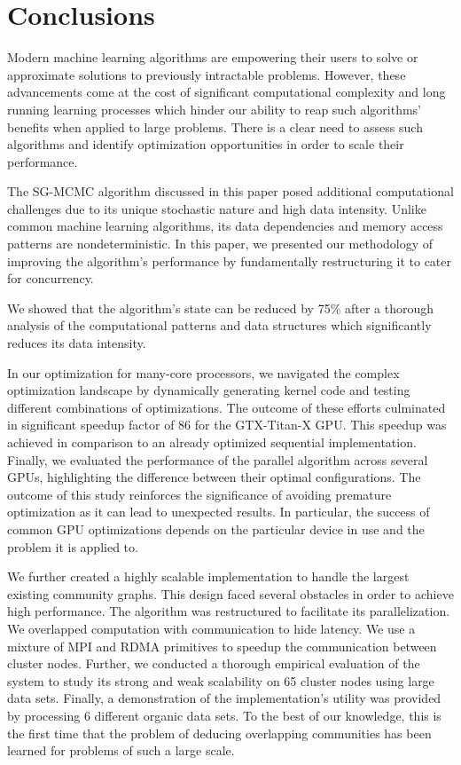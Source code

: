 \section{Conclusions}
\label{sec-conclusion}

Modern machine learning algorithms are empowering their
users to solve or approximate solutions to previously intractable problems.
However, these advancements come at the cost of significant computational
complexity and long running learning processes which hinder our ability to reap
such algorithms' benefits when applied to large problems. There is a clear need
to assess such algorithms and identify optimization opportunities in order to
scale their performance.

The SG-MCMC algorithm discussed in this paper posed additional computational
challenges due to its unique stochastic nature and high data intensity. Unlike
common machine learning algorithms, its data dependencies and memory access
patterns are nondeterministic. In this paper, we presented our methodology of
improving the algorithm's performance by fundamentally restructuring it to
cater for concurrency.

We showed that the algorithm's state can be reduced by 75\% after a thorough
analysis of the computational patterns and data structures which significantly
reduces its data intensity.

In our optimization for many-core processors, we navigated the complex optimization
landscape by dynamically generating kernel code and testing different
combinations of optimizations. The outcome of these efforts culminated in
significant speedup factor of 86 for the GTX-\mbox{Titan-X} GPU.
This speedup was achieved in comparison to an already
optimized sequential implementation. Finally, we evaluated the performance of
the parallel algorithm across several GPUs, highlighting the difference between
their optimal configurations.
%
The outcome of this study reinforces the significance of avoiding premature
optimization as it can lead to unexpected results. In particular, the success
of common GPU optimizations depends on the particular device in use and the
problem it is applied to.

We further created a highly scalable implementation to handle the largest existing
community graphs.
This design faced
several obstacles in order to achieve high performance.
The algorithm was restructured to facilitate its
parallelization. We overlapped computation
with communication to hide latency.  We use a
mixture of MPI and RDMA primitives to speedup the communication between cluster
nodes.
%
Further, we conducted a thorough empirical evaluation of the system to study its strong
and weak scalability on 65 cluster nodes using large data sets.
Finally, a
demonstration of the implementation's utility was provided by processing 6
different organic data sets.
To the best of
our knowledge, this is the first time that the problem of deducing overlapping
communities has been learned for problems of such a large scale.
